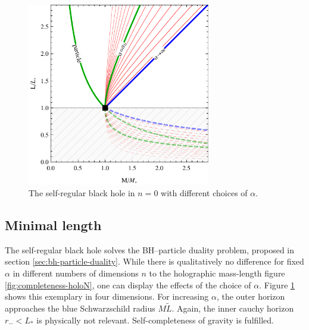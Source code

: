 \documentclass[12pt,a4paper]{report}
\numberwithin{equation}{chapter}
\begin{document}
\begin{figure}
\vspace*{-2.0cm}%
\begin{center}
\includegraphics[width=8cm]{figures/completeness-halpha.pdf}
\end{center}
\vspace*{-0.5cm}%
\caption{The self-regular black hole in $n=0$ with different choices of $\alpha$.}%
\label{fig:completeness-halpha}
\end{figure}

\subsection{Minimal length}
The self-regular black hole solves the BH--particle duality problem, proposed in section \ref{sec:bh-particle-duality}. While there is qualitatively no difference for fixed $\alpha$ in different numbers of dimensions $n$ to the holographic mass-length figure \ref{fig:completeness-holoN}, one can display the effects of the choice of $\alpha$. Figure \ref{fig:completeness-halpha} shows this exemplary in four dimensions. For increasing $\alpha$, the outer horizon approaches the blue Schwarzschild radius $M \tilde L$. Again, the inner cauchy horizon $r_-<L_*$ is physically not relevant. Self-completeness of gravity is fulfilled.


%
\end{document}
